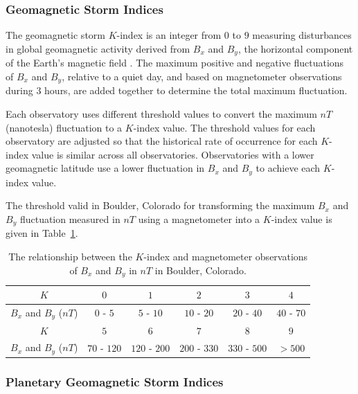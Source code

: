 \documentclass[sn-mathphys-num]{sn-jnl}%
\begin{document}
\subsubsection{Geomagnetic Storm Indices}

The geomagnetic storm $K$-index is an integer from $0$ to $9$ measuring disturbances in global geomagnetic activity derived from $B_{x}$ and $B_{y}$, the horizontal component of the Earth's magnetic field \cite{de2007ionosphere}. The maximum positive and negative fluctuations of $B_{x}$ and $B_{y}$, relative to a quiet day, and based on magnetometer observations during $3$ hours, are added together to determine the total maximum fluctuation.

Each observatory uses different threshold values to convert the maximum $nT$ (nanotesla) fluctuation to a $K$-index value. The threshold values for each observatory are adjusted so that the historical rate of occurrence for each $K$-index value is similar across all observatories. Observatories with a lower geomagnetic latitude use a lower fluctuation in $B_{x}$ and $B_{y}$ to achieve each $K$-index value. 

The threshold valid in Boulder, Colorado \cite{NOAA2024bKindex} for transforming the maximum $B_{x}$ and $B_{y}$ fluctuation measured in $nT$ using a magnetometer into a $K$-index value is given in Table~\ref{tab:K}.

\begin{table}[!ht]
    \centering
    \caption{The relationship between the $K$-index and  magnetometer observations of $B_{x}$ and $B_{y}$ in $nT$ in Boulder, Colorado.}
    \label{tab:K}
    \begin{tabular}{|c|c|c|c|c|c|}
        \hline
        $K$ & $0$ & $1$ & $2$ & $3$ & $4$ \\ \hline
        $B_{x}$ and $B_{y}$ ($nT$)& $0$ - $5$ & $5$ - $10$ & $10$ - $20$ & $20$ - $40$ & $40$ - $70$ \\ \hline
        $K$ & $5$ & $6$ & $7$ & $8$ & $9$ \\ \hline
        $B_{x}$ and $B_{y}$ ($nT$) & $70$ - $120$ & $120$ - $200$ & $200$ - $330$ & $330$ - $500$ & $>500$ \\ \hline
    \end{tabular}
\end{table}

\subsubsection{Planetary Geomagnetic Storm Indices}
\end{document}
